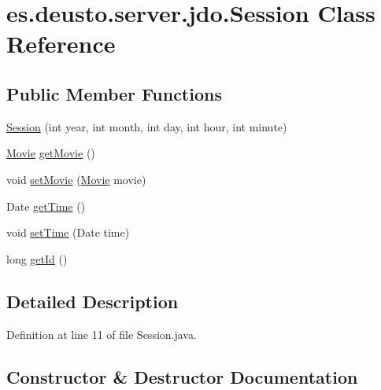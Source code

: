 \hypertarget{classes_1_1deusto_1_1server_1_1jdo_1_1_session}{}\section{es.\+deusto.\+server.\+jdo.\+Session Class Reference}
\label{classes_1_1deusto_1_1server_1_1jdo_1_1_session}
\subsection*{Public Member Functions}
\begin{DoxyCompactItemize}
\item 
\mbox{\hyperlink{classes_1_1deusto_1_1server_1_1jdo_1_1_session_acebd495eed4a395e55f12dc62463d4c7}{Session}} (int year, int month, int day, int hour, int minute)
\item 
\mbox{\hyperlink{classes_1_1deusto_1_1server_1_1jdo_1_1_movie}{Movie}} \mbox{\hyperlink{classes_1_1deusto_1_1server_1_1jdo_1_1_session_afdae557964a51e2d6b037db206b344c1}{get\+Movie}} ()
\item 
void \mbox{\hyperlink{classes_1_1deusto_1_1server_1_1jdo_1_1_session_ae4e58ddc0ec278e4f16eba20755b5ceb}{set\+Movie}} (\mbox{\hyperlink{classes_1_1deusto_1_1server_1_1jdo_1_1_movie}{Movie}} movie)
\item 
Date \mbox{\hyperlink{classes_1_1deusto_1_1server_1_1jdo_1_1_session_aa2855c0e0f810bc64c6c84fbfab2f977}{get\+Time}} ()
\item 
void \mbox{\hyperlink{classes_1_1deusto_1_1server_1_1jdo_1_1_session_a24a0fb018aaa31864d30260cfadfc1f0}{set\+Time}} (Date time)
\item 
long \mbox{\hyperlink{classes_1_1deusto_1_1server_1_1jdo_1_1_session_ade2b7eec9ef10a4c733aa3f4b18a8fe3}{get\+Id}} ()
\end{DoxyCompactItemize}


\subsection{Detailed Description}


Definition at line 11 of file Session.\+java.



\subsection{Constructor \& Destructor Documentation}
\mbox{\label{classes_1_1deusto_1_1server_1_1jdo_1_1_session_acebd495eed4a395e55f12dc62463d4c7}} 
